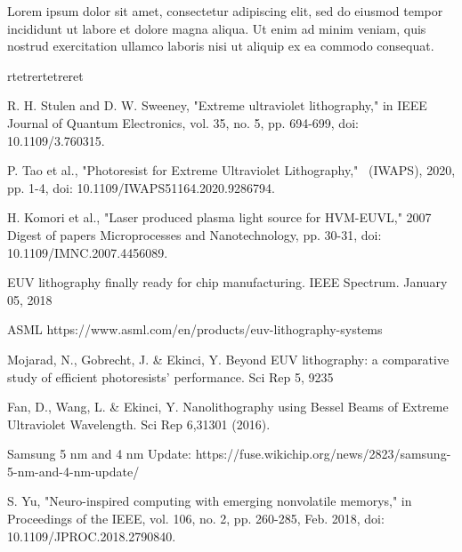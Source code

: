 \documentclass{article}     %
\begin{document}
 Lorem ipsum dolor sit amet, consectetur adipiscing elit, sed do eiusmod tempor \cite{ref7}
 incididunt ut labore et dolore magna aliqua. Ut enim ad minim veniam, quis \cite{ref4}
 nostrud exercitation ullamco laboris nisi ut aliquip ex ea commodo consequat.\cite{ref3}
 
 \setlength{\parindent}{8em}rtetrertetreret
\begin{thebibliography}{99}

  R. H. Stulen and D. W. Sweeney, "Extreme ultraviolet lithography," in IEEE Journal of Quantum Electronics, 
        vol. 35, no. 5, pp. 694-699, doi: 10.1109/3.760315.
  
  P. Tao et al., "Photoresist for Extreme Ultraviolet Lithography,"  (IWAPS), 2020, pp. 1-4, 
       doi: 10.1109/IWAPS51164.2020.9286794.
  
  H. Komori et al., "Laser produced plasma light source for HVM-EUVL," 2007 Digest of papers 
       Microprocesses and Nanotechnology, pp. 30-31, doi: 10.1109/IMNC.2007.4456089.
  
  EUV lithography finally ready for chip manufacturing. IEEE Spectrum. January 05, 2018
  
  ASML https://www.asml.com/en/products/euv-lithography-systems      
  
  Mojarad, N., Gobrecht, J. \& Ekinci, Y. Beyond EUV lithography: a comparative study of efficient photoresists' performance. Sci Rep 5, 9235
  
  Fan, D., Wang, L. \& Ekinci, Y. Nanolithography using Bessel Beams of Extreme Ultraviolet Wavelength. Sci Rep 6,31301 (2016).
  
  Samsung 5 nm and 4 nm Update: https://fuse.wikichip.org/news/2823/samsung-5-nm-and-4-nm-update/
  
  S. Yu, "Neuro-inspired computing with emerging nonvolatile memorys," in Proceedings of the IEEE, vol. 106, no. 2, pp. 260-285, Feb. 2018, doi: 10.1109/JPROC.2018.2790840.
  
  \end{thebibliography}
\end{document}

